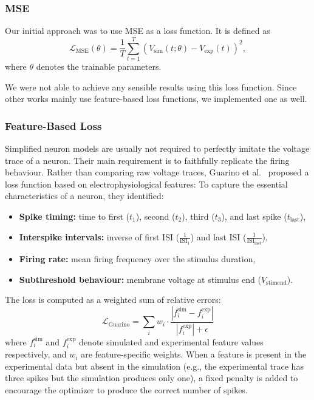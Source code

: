 \documentclass[conference]{IEEEtran}
\begin{document}
\subsubsection{MSE}\label{sec:mse-loss}
Our initial approach was to use \ac{MSE} as a loss function.
It is defined as
\begin{equation}\label{eq:MSE}
    \mathcal{L}_{\text{MSE}}(\theta) = \frac{1}{T} \sum_{t=1}^{T} \left( V_{\text{sim}}(t; \theta) - V_{\text{exp}}(t) \right)^2,
\end{equation}
where $\theta$ denotes the trainable parameters.

We were not able to achieve any sensible results using this loss function.
Since other works mainly use feature-based loss functions, we implemented one as well.

\subsubsection{Feature-Based Loss}\label{sec:feature-loss}
Simplified neuron models are usually not required to perfectly imitate the voltage trace of a neuron.
Their main requirement is to faithfully replicate the firing behaviour.
Rather than comparing raw voltage traces, Guarino et al.~\cite{Guarino2025} proposed a loss function based on electrophysiological features:
To capture the essential characteristics of a neuron, they identified:
\begin{itemize}
    \item \textbf{Spike timing:} time to first ($t_1$), second ($t_2$), third ($t_3$), and last spike ($t_{\text{last}}$),
    \item \textbf{Interspike intervals:} inverse of first ISI ($\frac{1}{\text{ISI}_1}$) and last ISI ($\frac{1}{\text{ISI}_{\text{last}}}$),
    \item \textbf{Firing rate:} mean firing frequency over the stimulus duration,
    \item \textbf{Subthreshold behaviour:} membrane voltage at stimulus end ($V_{\text{stimend}}$).
\end{itemize}

The loss is computed as a weighted sum of relative errors:
\begin{equation}\label{eq:guarino}
    \mathcal{L}_{\text{Guarino}} = \sum_i w_i \cdot \frac{|f_i^{\text{sim}} - f_i^{\text{exp}}|}{|f_i^{\text{exp}}| + \epsilon}
\end{equation}
where $f_i^{\text{sim}}$ and $f_i^{\text{exp}}$ denote simulated and experimental feature values respectively, and $w_i$ are feature-specific weights.
When a feature is present in the experimental data but absent in the simulation (e.g., the experimental trace has three spikes but the simulation produces only one),
a fixed penalty is added to encourage the optimizer to produce the correct number of spikes.
\end{document}
